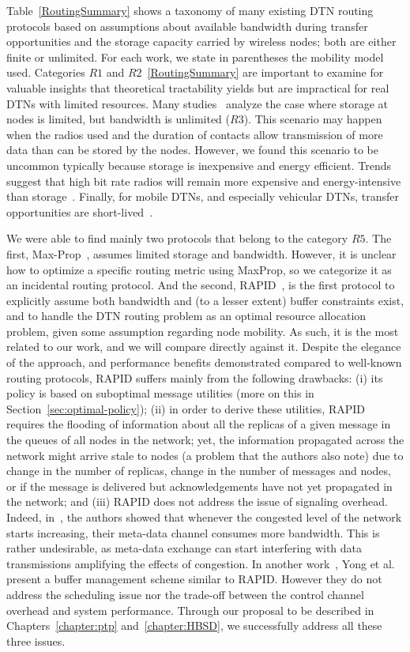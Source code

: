 Table~\ref{RoutingSummary} shows a taxonomy of many existing DTN routing protocols based on assumptions about available bandwidth during transfer opportunities and the storage
capacity carried by wireless nodes; both are either finite or unlimited. For each work, we state in parentheses the mobility model used. 
Categories $R1$ and $R2$~\ref{RoutingSummary} are important to examine for valuable insights that theoretical tractability yields but are impractical for real DTNs with limited resources. Many studies~\cite{Lindgren:probabilistic,Wearable,MVRouting} analyze the case where storage at nodes is limited, but bandwidth is unlimited ($R3$). This scenario may happen when the radios used and the duration of contacts allow transmission of more data than can be stored by the nodes. However, we found this scenario to be uncommon typically because storage is inexpensive and energy efficient. Trends suggest that high bit rate radios will remain more expensive and energy-intensive than storage~\cite{PRESTO}. Finally, for mobile DTNs, and especially vehicular DTNs, transfer opportunities are short-lived~\cite{Levine:MaxProp}.

We were able to find mainly two protocols that belong to the category $R5$. The first, Max-Prop~\cite{Levine:MaxProp}, assumes limited storage and bandwidth. However, it is unclear how to optimize a specific routing metric using MaxProp, so we categorize it as an incidental routing protocol. And the second, RAPID~\cite{BalasubramanianLV07}, is the first protocol to explicitly assume both bandwidth and (to a lesser extent) buffer constraints exist, and to handle the DTN routing problem as an optimal resource allocation problem, given some assumption regarding node mobility. As such, it is the most related to our work, and we will compare directly against it. Despite the elegance of the approach, and performance benefits demonstrated compared to well-known routing protocols, RAPID suffers mainly from the following drawbacks: (i) its policy is based on suboptimal message utilities (more on this in Section~\ref{sec:optimal-policy}); (ii) in order to derive these utilities, RAPID requires the flooding of information about all the replicas of a given message in the queues of all nodes in the network; yet, the information propagated across the network might arrive stale to nodes (a problem that the authors also note) due to change in the number of replicas, change in the number of messages and nodes, or if the message is delivered but acknowledgements have not yet propagated in the network; and (iii) RAPID does not address the issue of signaling overhead. Indeed, in~\cite{Levine:Sigcomm07}, the authors showed that whenever the congested level of the network starts increasing, their meta-data channel consumes more bandwidth. This is rather undesirable, as meta-data exchange can start interfering with data transmissions amplifying the effects of congestion. In another work~\cite{AOBM}, Yong et al. present a buffer management scheme similar to RAPID. However they do not address the scheduling issue nor the trade-off between the control channel overhead and system performance. Through our proposal to be described in Chapters~\ref{chapter:ptp} and~\ref{chapter:HBSD}, we successfully address all these three issues.

